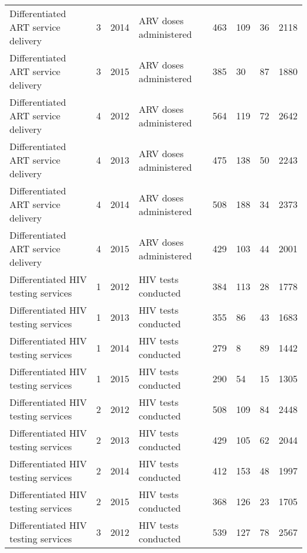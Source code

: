 \documentclass{article}
\begin{document}
\begin{table}[]
\begin{tabular}{llllllll}
Differentiated ART service delivery & 3    & 2014 & ARV doses administered     & 463       & 109                & 36              & 2118   \\
Differentiated ART service delivery & 3    & 2015 & ARV doses administered     & 385       & 30                 & 87              & 1880   \\
Differentiated ART service delivery & 4    & 2012 & ARV doses administered     & 564       & 119                & 72              & 2642   \\
Differentiated ART service delivery & 4    & 2013 & ARV doses administered     & 475       & 138                & 50              & 2243   \\
Differentiated ART service delivery & 4    & 2014 & ARV doses administered     & 508       & 188                & 34              & 2373   \\
Differentiated ART service delivery & 4    & 2015 & ARV doses administered     & 429       & 103                & 44              & 2001   \\
Differentiated HIV testing services & 1    & 2012 & HIV tests conducted        & 384       & 113                & 28              & 1778   \\
Differentiated HIV testing services & 1    & 2013 & HIV tests conducted        & 355       & 86                 & 43              & 1683   \\
Differentiated HIV testing services & 1    & 2014 & HIV tests conducted        & 279       & 8                  & 89              & 1442   \\
Differentiated HIV testing services & 1    & 2015 & HIV tests conducted        & 290       & 54                 & 15              & 1305   \\
Differentiated HIV testing services & 2    & 2012 & HIV tests conducted        & 508       & 109                & 84              & 2448   \\
Differentiated HIV testing services & 2    & 2013 & HIV tests conducted        & 429       & 105                & 62              & 2044   \\
Differentiated HIV testing services & 2    & 2014 & HIV tests conducted        & 412       & 153                & 48              & 1997   \\
Differentiated HIV testing services & 2    & 2015 & HIV tests conducted        & 368       & 126                & 23              & 1705   \\
Differentiated HIV testing services & 3    & 2012 & HIV tests conducted        & 539       & 127                & 78              & 2567   \\

\end{tabular}
\end{table}
\end{document}
